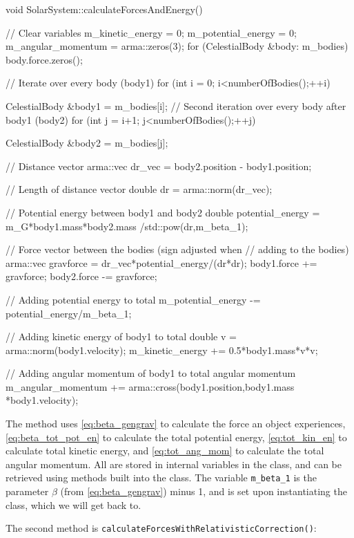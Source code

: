 \documentclass[reprint,english,notitlepage]{revtex4-1}  %
\begin{document}
\begin{cpp}
void SolarSystem::calculateForcesAndEnergy() {
  // Clear variables
  m_kinetic_energy = 0;
  m_potential_energy = 0;
  m_angular_momentum = arma::zeros(3);
  for (CelestialBody &body: m_bodies) {
    body.force.zeros();
  }

  // Iterate over every body (body1)
  for (int i = 0; i<numberOfBodies();++i){
    CelestialBody &body1 = m_bodies[i];
    // Second iteration over every body after body1 (body2)
    for (int j = i+1; j<numberOfBodies();++j) {
      CelestialBody &body2 = m_bodies[j];

      // Distance vector
      arma::vec dr_vec = body2.position - body1.position;

      // Length of distance vector
      double dr = arma::norm(dr_vec);

      // Potential energy between body1 and body2
      double potential_energy = m_G*body1.mass*body2.mass
      							/std::pow(dr,m_beta_1);

      // Force vector between the bodies (sign adjusted when 
      // adding to the bodies)
      arma::vec gravforce = dr_vec*potential_energy/(dr*dr);
      body1.force += gravforce;
      body2.force -= gravforce;

      // Adding potential energy to total
      m_potential_energy -= potential_energy/m_beta_1;
    }

    // Adding kinetic energy of body1 to total
    double v = arma::norm(body1.velocity);
    m_kinetic_energy += 0.5*body1.mass*v*v;

    // Adding angular momentum of body1 to total angular momentum
    m_angular_momentum += arma::cross(body1.position,body1.mass
    								  *body1.velocity);
  }
}
\end{cpp}

The method uses \eqref{eq:beta_gengrav} to calculate the force an object experiences, \eqref{eq:beta_tot_pot_en} to calculate the total potential energy, \eqref{eq:tot_kin_en} to calculate total kinetic energy, and \eqref{eq:tot_ang_mom} to calculate the total angular momentum. All are stored in internal variables in the class, and can be retrieved using methods built into the class. The variable \verb+m_beta_1+ is the parameter $\beta$ (from \eqref{eq:beta_gengrav}) minus 1, and is set upon instantiating the class, which we will get back to. 

The second method is \verb+calculateForcesWithRelativisticCorrection()+:
\end{document}
